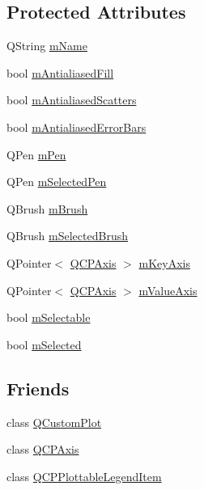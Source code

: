 \subsection*{Protected Attributes}
\begin{DoxyCompactItemize}
\item 
Q\+String \hyperlink{class_q_c_p_abstract_plottable_ac29ffef424e2488675930de18cde612a}{m\+Name}
\item 
bool \hyperlink{class_q_c_p_abstract_plottable_a152ac765bedf927fb240545d11d453ea}{m\+Antialiased\+Fill}
\item 
bool \hyperlink{class_q_c_p_abstract_plottable_aa115755e525a8e3a86dc683f9cab755b}{m\+Antialiased\+Scatters}
\item 
bool \hyperlink{class_q_c_p_abstract_plottable_ad48660b2bd301576e92fb033d8f455ea}{m\+Antialiased\+Error\+Bars}
\item 
Q\+Pen \hyperlink{class_q_c_p_abstract_plottable_a67bc0622fd1b9fa14e54c14922dcec66}{m\+Pen}
\item 
Q\+Pen \hyperlink{class_q_c_p_abstract_plottable_a10619472f5d5e10e9519a599f1cf5576}{m\+Selected\+Pen}
\item 
Q\+Brush \hyperlink{class_q_c_p_abstract_plottable_a33f00674c0161c13315ab9da0895418e}{m\+Brush}
\item 
Q\+Brush \hyperlink{class_q_c_p_abstract_plottable_aea3c0da30c7a8be23ad5f2d9bca36762}{m\+Selected\+Brush}
\item 
Q\+Pointer$<$ \hyperlink{class_q_c_p_axis}{Q\+C\+P\+Axis} $>$ \hyperlink{class_q_c_p_abstract_plottable_a426f42e254d0f8ce5436a868c61a6827}{m\+Key\+Axis}
\item 
Q\+Pointer$<$ \hyperlink{class_q_c_p_axis}{Q\+C\+P\+Axis} $>$ \hyperlink{class_q_c_p_abstract_plottable_a2901452ca4aea911a1827717934a4bda}{m\+Value\+Axis}
\item 
bool \hyperlink{class_q_c_p_abstract_plottable_aceee52342c8e75727abcbd164986fdcb}{m\+Selectable}
\item 
bool \hyperlink{class_q_c_p_abstract_plottable_a43f68a0603e9bcd016bdfa6d9d5c41c9}{m\+Selected}
\end{DoxyCompactItemize}
\subsection*{Friends}
\begin{DoxyCompactItemize}
\item 
class \hyperlink{class_q_c_p_abstract_plottable_a1cdf9df76adcfae45261690aa0ca2198}{Q\+Custom\+Plot}
\item 
class \hyperlink{class_q_c_p_abstract_plottable_af123edeca169ec7a31958a1d714e1a8a}{Q\+C\+P\+Axis}
\item 
class \hyperlink{class_q_c_p_abstract_plottable_a104c78e91302afd6842a903e472f552f}{Q\+C\+P\+Plottable\+Legend\+Item}
\end{DoxyCompactItemize}


